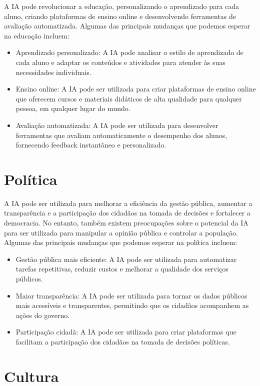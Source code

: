 \documentclass[12pt,twoside]{book}
\begin{document}
A IA pode revolucionar a educação, personalizando o aprendizado para cada aluno, criando plataformas de ensino online e desenvolvendo ferramentas de avaliação automatizada. Algumas das principais mudanças que podemos esperar na educação incluem:
\begin{itemize}
    \item Aprendizado personalizado: A IA pode analisar o estilo de aprendizado de cada aluno e adaptar os conteúdos e atividades para atender às suas necessidades individuais.
    \item Ensino online: A IA pode ser utilizada para criar plataformas de ensino online que oferecem cursos e materiais didáticos de alta qualidade para qualquer pessoa, em qualquer lugar do mundo.
    \item Avaliação automatizada: A IA pode ser utilizada para desenvolver ferramentas que avaliam automaticamente o desempenho dos alunos, fornecendo feedback instantâneo e personalizado.
\end{itemize}

\section{Política}

A IA pode ser utilizada para melhorar a eficiência da gestão pública, aumentar a transparência e a participação dos cidadãos na tomada de decisões e fortalecer a democracia. No entanto, também existem preocupações sobre o potencial da IA para ser utilizada para manipular a opinião pública e controlar a população. Algumas das principais mudanças que podemos esperar na política incluem:
\begin{itemize}
    \item Gestão pública mais eficiente: A IA pode ser utilizada para automatizar tarefas repetitivas, reduzir custos e melhorar a qualidade dos serviços públicos.
    \item Maior transparência: A IA pode ser utilizada para tornar os dados públicos mais acessíveis e transparentes, permitindo que os cidadãos acompanhem as ações do governo.
    \item Participação cidadã: A IA pode ser utilizada para criar plataformas que facilitam a participação dos cidadãos na tomada de decisões políticas.
\end{itemize}

\section{Cultura}
\end{document}
